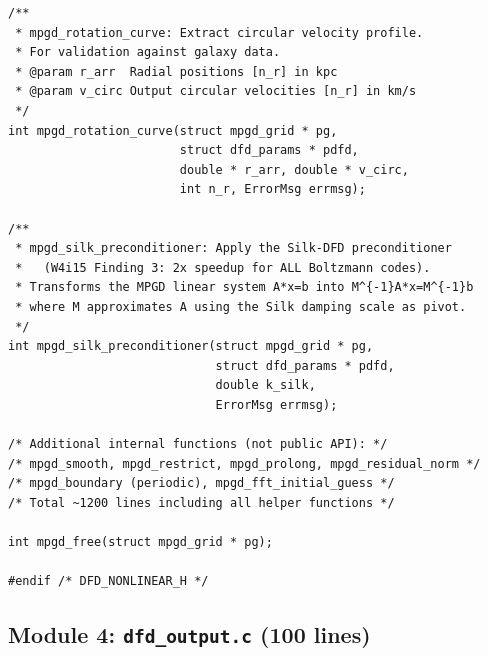\documentclass[11pt]{article}
\theoremstyle{definition}
\theoremstyle{remark}
\begin{document}
\begin{lstlisting}[caption={Module 3: Key function signatures}]
/**
 * mpgd_rotation_curve: Extract circular velocity profile.
 * For validation against galaxy data.
 * @param r_arr  Radial positions [n_r] in kpc
 * @param v_circ Output circular velocities [n_r] in km/s
 */
int mpgd_rotation_curve(struct mpgd_grid * pg,
                        struct dfd_params * pdfd,
                        double * r_arr, double * v_circ,
                        int n_r, ErrorMsg errmsg);

/**
 * mpgd_silk_preconditioner: Apply the Silk-DFD preconditioner
 *   (W4i15 Finding 3: 2x speedup for ALL Boltzmann codes).
 * Transforms the MPGD linear system A*x=b into M^{-1}A*x=M^{-1}b
 * where M approximates A using the Silk damping scale as pivot.
 */
int mpgd_silk_preconditioner(struct mpgd_grid * pg,
                             struct dfd_params * pdfd,
                             double k_silk,
                             ErrorMsg errmsg);

/* Additional internal functions (not public API): */
/* mpgd_smooth, mpgd_restrict, mpgd_prolong, mpgd_residual_norm */
/* mpgd_boundary (periodic), mpgd_fft_initial_guess */
/* Total ~1200 lines including all helper functions */

int mpgd_free(struct mpgd_grid * pg);

#endif /* DFD_NONLINEAR_H */
\end{lstlisting}

\subsection{Module 4: \texttt{dfd\_output.c} (100 lines)}
\end{document}
